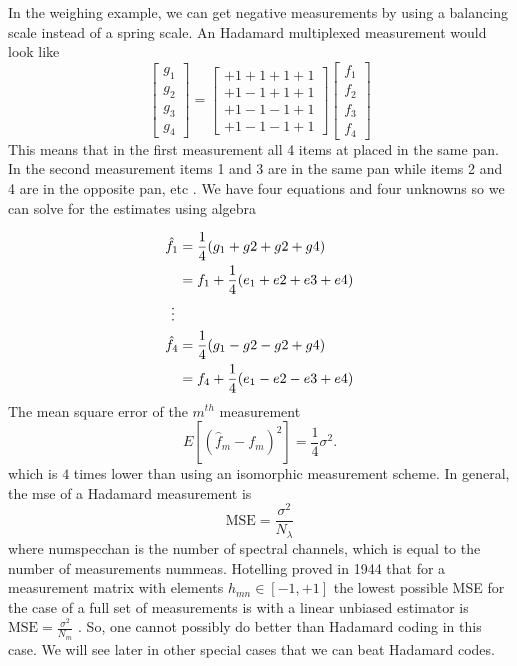 In the weighing example, we can get negative measurements by using a balancing scale instead of a spring scale. An Hadamard multiplexed measurement would look like
\begin{equation}
\left[ \begin{matrix} g_{1}\\ g_{2}\\ g_{3}\\ g_{4}\end{matrix} \right] =\left[ \begin{matrix} +1 +1 +1 +1 \\ +1 -1 +1 +1 \\ +1 -1 -1 +1 \\ +1 -1 -1 +1 \end{matrix} \right] \left[ \begin{matrix} f_{1}\\ f_{2}\\ f_{3}\\ f_{4}\end{matrix} \right]
\end{equation}
This means that in the first measurement all 4 items at placed in the same pan. In the second measurement items 1 and 3 are in the same pan while items 2 and 4 are in the opposite pan, etc \cite{harwit2012hadamard}. We have four equations and four unknowns so we can solve for the estimates using algebra

\begin{align*}
  \hat{f}_1 &= \frac{1}{4} (g_1 + g2 + g2 +g4) \\
  &= f_1 + \frac{1}{4}(e_1 + e2 + e3 + e4) \\
        \mathrel{\makebox[\widthof{=}]{\vdots}} \\
  \hat{f}_4 &= \frac{1}{4} (g_1 - g2 - g2 +g4) \\
  &= f_4 + \frac{1}{4}(e_1 - e2 - e3 + e4)
\end{align*}
The mean square error of the $m^{th}$ measurement  
\begin{equation}
	E [ ( \hat{f}_{m} - {f}_{m} )^2 ] = \frac{1}{4} \sigma^2.
\end{equation}
which is $4$ times lower than using an isomorphic measurement scheme. In general, the \gls{mse} of a Hadamard measurement is 
\begin{equation}
	\text{MSE} = \frac{\sigma^2}{N_{\lambda}}
	\label{eq:hadamardmse}
\end{equation}
where \gls{numspecchan} is the number of spectral channels, which is equal to the number of measurements \gls{nummeas}. Hotelling proved in 1944 that for a measurement matrix with elements $h_{mn} \in [-1, +1]$ the lowest possible MSE for the case of a full set of measurements is with a linear unbiased estimator is $\text{MSE} = \frac{\sigma^2}{N_m}$ \cite{brady2009optical}. So, one cannot possibly do better than Hadamard coding in this case. We will see later in other special cases that we can beat Hadamard codes.

